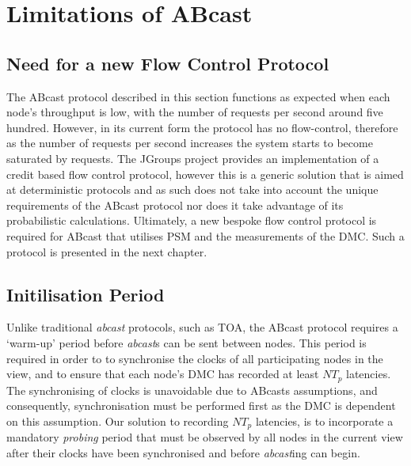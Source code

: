 \section{Limitations of ABcast}
\subsection*{Need for a new Flow Control Protocol}
The \textsf{ABcast} protocol described in this section functions as expected when each node's throughput is low, with the number of requests per second around five hundred.  However, in its current form the protocol has no flow-control, therefore as the number of requests per second increases the system starts to become saturated by requests.  The JGroups project provides an implementation of a credit based flow control protocol, however this is a generic solution that is aimed at deterministic protocols and as such does not take into account the unique requirements of the \textsf{ABcast} protocol nor does it take advantage of its probabilistic calculations.  Ultimately, a new bespoke flow control protocol is required for \textsf{ABcast} that utilises PSM and the measurements of the DMC.  Such a protocol is presented in the next chapter.  

\subsection*{Initilisation Period}
    Unlike traditional \emph{abcast} protocols, such as TOA, the \textsf{ABcast} protocol requires a \textquoteleft{}warm-up' period before \emph{abcast}s can be sent between nodes.  This period is required in order to to synchronise the clocks of all participating nodes in the view, and to ensure that each node's DMC has recorded at least $NT_p$ latencies.  The synchronising of clocks is unavoidable due to \textsf{ABcast}s assumptions, and consequently, synchronisation must be performed first as the DMC is dependent on this assumption.  Our solution to recording $NT_p$ latencies, is to incorporate a mandatory \emph{probing} period that must be observed by all nodes in the current view after their clocks have been synchronised and before \emph{abcast}ing can begin.  


